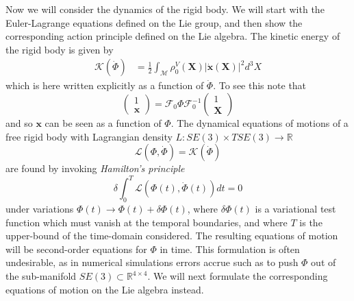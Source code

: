Now we will consider the dynamics of the rigid body. We will start with the Euler-Lagrange equations defined on the Lie group, and then show the corresponding action principle defined on the Lie algebra. The kinetic energy of the rigid body is given by
\begin{equation}  \label{eq:rigid body kinetic energy}
\begin{aligned}
\mathcal{K}(\dot{\Phi}) & = \frac{1}{2} \int_\mathcal{M} \rho^V_0(\mathbf{X}) |\dot{\mathbf{x}}(\mathbf{X})|^2  d^3 X
\end{aligned}
\end{equation}
which is here written explicitly as a function of $\dot{\Phi}$. To see this note that
\begin{equation}
\begin{pmatrix} 1 \\ \mathbf{x} \end{pmatrix} = \mathcal{F}_0 \Phi \mathcal{F}_0^{-1} \begin{pmatrix} 1 \\ \mathbf{X} \end{pmatrix}
\end{equation}
and so $\mathbf{x}$ can be seen as a function of $\Phi$. The dynamical equations of motions of a free rigid body with Lagrangian density $L : SE(3) \times TSE(3) \to \mathbb{R}$
\begin{equation}
\mathcal{L}(\Phi, \dot{\Phi}) = \mathcal{K}(\dot{\Phi})
\end{equation}
are found by invoking \textit{Hamilton's principle}
\begin{equation} \label{eq:rigid body hamiltons principle}
\delta \int_0^{T} \mathcal{L}(\Phi(t), \dot{\Phi}(t)) dt = 0
\end{equation}
under variations $\Phi(t) \to \Phi(t) + \delta \Phi (t)$, where $\delta \Phi (t)$ is a variational test function which must vanish at the temporal boundaries, and where $T$ is the upper-bound of the time-domain considered. The resulting equations of motion will be second-order equations for $\Phi$ in time. This formulation is often undesirable, as in numerical simulations errors accrue such as to push $\Phi$ out of the sub-manifold $SE(3) \subset \mathbb{R}^{4 \times 4}$. We will next formulate the corresponding equations of motion on the Lie algebra instead.


